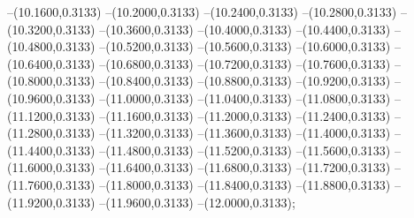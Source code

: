 {	--(10.1600,0.3133)
	--(10.2000,0.3133)
	--(10.2400,0.3133)
	--(10.2800,0.3133)
	--(10.3200,0.3133)
	--(10.3600,0.3133)
	--(10.4000,0.3133)
	--(10.4400,0.3133)
	--(10.4800,0.3133)
	--(10.5200,0.3133)
	--(10.5600,0.3133)
	--(10.6000,0.3133)
	--(10.6400,0.3133)
	--(10.6800,0.3133)
	--(10.7200,0.3133)
	--(10.7600,0.3133)
	--(10.8000,0.3133)
	--(10.8400,0.3133)
	--(10.8800,0.3133)
	--(10.9200,0.3133)
	--(10.9600,0.3133)
	--(11.0000,0.3133)
	--(11.0400,0.3133)
	--(11.0800,0.3133)
	--(11.1200,0.3133)
	--(11.1600,0.3133)
	--(11.2000,0.3133)
	--(11.2400,0.3133)
	--(11.2800,0.3133)
	--(11.3200,0.3133)
	--(11.3600,0.3133)
	--(11.4000,0.3133)
	--(11.4400,0.3133)
	--(11.4800,0.3133)
	--(11.5200,0.3133)
	--(11.5600,0.3133)
	--(11.6000,0.3133)
	--(11.6400,0.3133)
	--(11.6800,0.3133)
	--(11.7200,0.3133)
	--(11.7600,0.3133)
	--(11.8000,0.3133)
	--(11.8400,0.3133)
	--(11.8800,0.3133)
	--(11.9200,0.3133)
	--(11.9600,0.3133)
	--(12.0000,0.3133);
}
